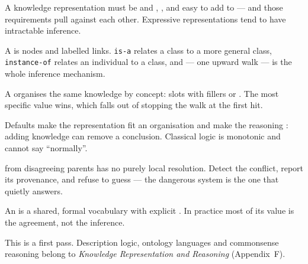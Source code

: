 \begin{chaptersummary}
\begin{tight}
  \item A knowledge representation must be  and
        , , and easy to add to --- and
        those requirements pull against each other. Expressive representations tend
        to have intractable inference.
  \item A  is nodes and labelled links. \texttt{is-a}
        relates a class to a more general class, \texttt{instance-of} relates an
        individual to a class, and  --- one upward walk --- is
        the whole inference mechanism.
  \item A  organises the same knowledge by concept: slots with fillers
        or . The most specific value wins, which falls out of
        stopping the walk at the first hit.
  \item Defaults make the representation fit an organisation and make the reasoning
        : adding knowledge can remove a conclusion. Classical
        logic is monotonic and cannot say ``normally''.
  \item {} from disagreeing parents has no purely local
        resolution. Detect the conflict, report its provenance, and refuse to
        guess --- the dangerous system is the one that quietly answers.
  \item An  is a shared, formal vocabulary with explicit
        . In practice most of its value is the
        agreement, not the inference.
  \item This is a first pass. Description logic, ontology languages and commonsense
        reasoning belong to \emph{Knowledge Representation and Reasoning}
        (Appendix~F).
\end{tight}
\end{chaptersummary}


